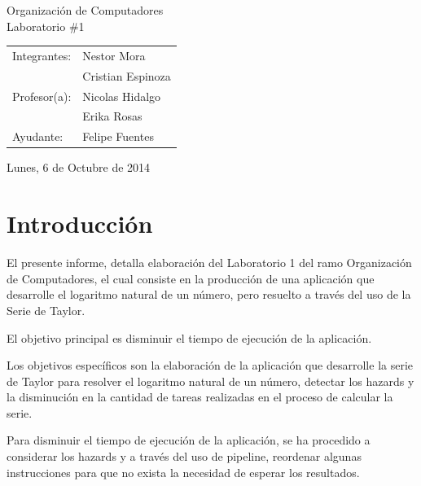 \documentclass[12pt,letterpaper]{article}
\begin{document}
	\vspace*{3cm}
	\par
	\vspace{1cm}
	\begin{center}
	\large
		Organización de Computadores\\Laboratorio \#1
	\end{center}
	\vspace{3cm}
	\begin{flushright}
		\begin{tabular}[t]{l l}
			Integrantes: & Nestor Mora \\
			             & Cristian Espinoza \\
			Profesor(a): & Nicolas Hidalgo \\
						 & Erika Rosas \\
			Ayudante: & Felipe Fuentes\\

		\end{tabular}
	\end{flushright}
	\begin{center}
		\vspace{3cm}
		Lunes, 6 de Octubre de 2014
	\end{center}



\newpage
\tableofcontents
\thispagestyle{empty}

\newpage
\renewcommand{\thepage}{\arabic{page}}
\setcounter{page}{1}
\section{Introducción}
El presente informe, detalla elaboración del Laboratorio 1 del ramo Organización de Computadores, el cual consiste en la producción de una aplicación que desarrolle el logaritmo natural de un número, pero resuelto a través del uso de la Serie de Taylor.

El objetivo principal es disminuir el tiempo de ejecución de la aplicación.

Los objetivos específicos son la elaboración de la aplicación que desarrolle la serie de Taylor para resolver el logaritmo natural de un número, detectar los hazards y la disminución en la cantidad de tareas realizadas en el proceso de calcular la serie.

Para disminuir el tiempo de ejecución de la aplicación, se ha procedido a considerar los hazards y a través del uso de pipeline, reordenar algunas instrucciones para que no exista la necesidad de esperar los resultados.
\newpage
\end{document}
